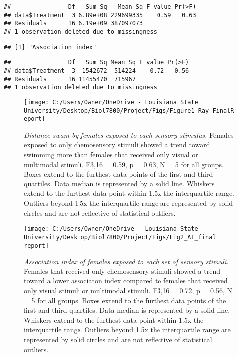 \documentclass[
  12pt,
]{article}
\begin{document}
\begin{verbatim}
##                Df   Sum Sq   Mean Sq F value Pr(>F)
## data$Treatment  3 6.89e+08 229699335    0.59   0.63
## Residuals      16 6.19e+09 387097073               
## 1 observation deleted due to missingness
\end{verbatim}

\begin{verbatim}
## [1] "Association index"
\end{verbatim}

\begin{verbatim}
##                Df   Sum Sq Mean Sq F value Pr(>F)
## data$Treatment  3  1542672  514224    0.72   0.56
## Residuals      16 11455470  715967               
## 1 observation deleted due to missingness
\end{verbatim}



\begin{figure}[H]

{\centering \texttt{[image: C:/Users/Owner/OneDrive - Louisiana State University/Desktop/Biol7800/Project/Figs/Figure1\_Ray\_FinalReport]} 

}

\caption{\emph{Distance swam by females exposed to each sensory stimulus.} Females exposed to only chemosensory stimuli showed a trend toward swimming more than females that received only visual or multimodal stimuli. F3,16 = 0.59, p = 0.63, N = 5 for all groups. Boxes extend to the furthest data points of the first and third quartiles. Data median is represented by a solid line. Whiskers extend to the furthest data point within 1.5x the interquartile range. Outliers beyond 1.5x the interquartile range are represented by solid circles and are not reflective of statistical outliers.}\label{fig:fig1}
\end{figure}



\begin{figure}[H]

{\centering \texttt{[image: C:/Users/Owner/OneDrive - Louisiana State University/Desktop/Biol7800/Project/Figs/Fig2\_AI\_final report]} 

}

\caption{\emph{Association index of females exposed to each set of sensory stimuli.} Females that received only chemosensory stimuli showed a trend toward a lower associaton index compared to females that received only visual stimuli or multimodal stimuli. F3,16 = 0.72, p = 0.56, N = 5 for all groups. Boxes extend to the furthest data points of the first and third quartiles. Data median is represented by a solid line. Whiskers extend to the furthest data point within 1.5x the interquartile range. Outliers beyond 1.5x the interquartile range are represented by solid circles and are not reflective of statistical outliers.}\label{fig:fig2}
\end{figure}
\end{document}
